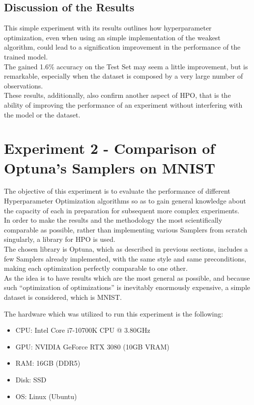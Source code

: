 \subsection{Discussion of the Results}

This simple experiment with its results outlines how hyperparameter optimization, even when using an simple implementation of the weakest algorithm, could lead to a signification improvement in the performance of the trained model.
\\[0.3cm]The gained 1.6\% accuracy on the Test Set may seem a little improvement, but is remarkable, especially when the dataset is composed by a very large number of observations.
\\[0.3cm]These results, additionally, also confirm another aspect of HPO, that is the ability of improving the performance of an experiment without interfering with the model or the dataset.

\section{Experiment 2 - Comparison of Optuna's Samplers on MNIST}

The objective of this experiment is to evaluate the performance of different Hyperparameter Optimization algorithms so as to gain general knowledge about the capacity of each in preparation for subsequent more complex experiments.
\\[0.3cm]In order to make the results and the methodology the most scientifically comparable as possible, rather than implementing various Samplers from scratch singularly, a library for HPO is used.
\\[0.3cm]The chosen library is Optuna, which as described in previous sections, includes a few Samplers already implemented, with the same style and same preconditions, making each optimization perfectly comparable to one other.
\\[0.3cm]As the idea is to have results which are the most general as possible, and because such “optimization of optimizations” is inevitably enormously expensive, a simple dataset is considered, which is MNIST.

The hardware which was utilized to run this experiment is the following:
\begin{itemize}[itemsep=0.1cm]
	\item CPU: Intel Core i7-10700K CPU @ 3.80GHz
	\item GPU: NVIDIA GeForce RTX 3080 (10GB VRAM)
	\item RAM: 16GB (DDR5)
	\item Disk: SSD
	\item OS: Linux (Ubuntu)
\end{itemize}

